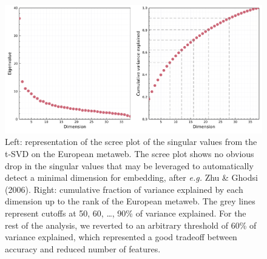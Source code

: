 \documentclass[11pt]{article}
\makeatletter
\def\maxwidth{\ifdim\Gin@nat@width>\linewidth\linewidth
\else\Gin@nat@width\fi}
\let\Oldincludegraphics\includegraphics
\renewcommand{\includegraphics}[1]{\Oldincludegraphics[width=\maxwidth]{#1}}
\providecommand{\DIFaddbeginFL}{} %
\providecommand{\DIFaddendFL}{} %
\providecommand{\DIFdelbeginFL}{} %
\providecommand{\DIFdelendFL}{} %
\newcommand{\DIFscaledelfig}{0.5}
\newlength{\DIFdelgraphicswidth} %
\newlength{\DIFdelgraphicsheight} %
\newcommand{\DIFaddincludegraphics}[2][]{{\color{blue}\fbox{\DIFOincludegraphics[#1]{#2}}}} %
\newcommand{\DIFdelincludegraphics}[2][]{%
\sbox{\DIFdelgraphicsbox}{\DIFOincludegraphics[#1]{#2}}%
\settoboxwidth{\DIFdelgraphicswidth}{\DIFdelgraphicsbox} %
\settoboxtotalheight{\DIFdelgraphicsheight}{\DIFdelgraphicsbox} %
\scalebox{\DIFscaledelfig}{%
\parbox[b]{\DIFdelgraphicswidth}{\usebox{\DIFdelgraphicsbox}\\[-\baselineskip] \rule{\DIFdelgraphicswidth}{0em}}\llap{\resizebox{\DIFdelgraphicswidth}{\DIFdelgraphicsheight}{%
\setlength{\unitlength}{\DIFdelgraphicswidth}%
\begin{picture}(1,1)%
\thicklines\linethickness{2pt} %
{\color[rgb]{1,0,0}\put(0,0){\framebox(1,1){}}}%
{\color[rgb]{1,0,0}\put(0,0){\line( 1,1){1}}}%
{\color[rgb]{1,0,0}\put(0,1){\line(1,-1){1}}}%
\end{picture}%
}\hspace*{3pt}}} %
} %
\DeclareRobustCommand{\DIFaddbeginFL}{\DIFOaddbeginFL \let\includegraphics\DIFaddincludegraphics} %
\DeclareRobustCommand{\DIFaddendFL}{\DIFOaddendFL \let\includegraphics\DIFOincludegraphics} %
\DeclareRobustCommand{\DIFdelbeginFL}{\DIFOdelbeginFL \let\includegraphics\DIFdelincludegraphics} %
\DeclareRobustCommand{\DIFdelendFL}{\DIFOaddendFL \let\includegraphics\DIFOincludegraphics} %
\makeatother
\begin{document}
\begin{figure}
\DIFdelbeginFL %
\DIFdelendFL \DIFaddbeginFL \hypertarget{fig:scree}{%
\centering
\includegraphics{figures/figure-screeplot.png}
\caption{Left: representation of the scree plot of the singular values
from the t-SVD on the European metaweb. The scree plot shows no obvious
drop in the singular values that may be leveraged to automatically
detect a minimal dimension for embedding, after \emph{e.g.} Zhu \&
Ghodsi (2006). Right: cumulative fraction of variance explained by each
dimension up to the rank of the European metaweb. The grey lines
represent cutoffs at 50, 60, \ldots, 90\% of variance explained. For the
rest of the analysis, we reverted to an arbitrary threshold of 60\% of
variance explained, which represented a good tradeoff between accuracy
and reduced number of features.}\label{fig:scree}
}
\DIFaddendFL 
\end{figure}
\end{document}
